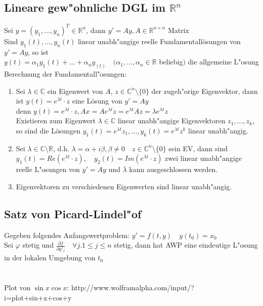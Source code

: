\documentclass[10pt,a4paper^, twocolumn]{article}
\newcommand{\menge}{\mathbb} %
\renewcommand{\phi}{\varphi} %
\begin{document}
\subsection{Lineare gew"ohnliche DGL im $\menge{R}^n$}
	Sei $y = (y_1,\dots,y_n)^T \in \menge{R}^n$, dann $y' = Ay, A \in \menge{R}^{n\times n}$ Matrix \\
	Sind $y_1(t),\dots,y_n(t)$ linear unabh"angige reelle Fundamentallösungen von $y' = Ay$,
	so ist \\
	$y(t) = \alpha_1 y_1(t)+\dots+\alpha_ny_(t) \quad (\alpha_1,\dots,\alpha_n \in \menge{R}$ beliebig$)$ die allgemeine L"osung\\
	Berechnung der Fundamentall"osungen:
	\begin{enumerate}
	\item{} Sei $\lambda \in \menge{C}$ ein Eigenwert von $A$, $z \in \menge{C}^n \setminus \{0\}$ der zugeh"orige Eigenvektor,
		dann ist $y(t) = e^{\lambda t} \cdot z$ eine Lösung von $y' = Ay$  \\
		denn $y(t) = e^{\lambda t} \cdot z, Ax = Ae^{\lambda t}z = e^{\lambda t}Az = \lambda e^{\lambda t}z$ \\
		Existieren zum Eigenwert $\lambda \in \menge{C}$ linear unabh"angige Eigenvektoren $z_1,\dots,z_k$, so sind die Lösungen
		$y_1(t) = e^{\lambda t}z_1, \dots, y_k(t) = e^{\lambda t}z^k$ linear unabh"angig.
	\item{} Sei $\lambda \in \menge{C} \setminus \menge{R}$, d.h. $\lambda = \alpha + i\beta, \beta \neq 0 \quad z \in \menge{C}^n \setminus \{0\}$ sein EV,
		dann sind $y_1(t) = Re(e^{\lambda t} \cdot z), \quad y_2(t) = Im(e^{\lambda t} \cdot z)$ zwei linear unabh"angige reelle L"osungen von $y' = Ay$ 
		und $\overline\lambda$ kann ausgeschlossen werden.
	\item{} Eigenvektoren zu verschiedenen Eigenwerten sind linear unabh"angig.
	\end{enumerate}

\subsection{Satz von Picard-Lindel"of}
	Gegeben folgendes Anfangswertproblem: $y' = f(t,y) \quad y(t_0) = x_0$ \\
	Sei $\phi$ stetig und $\frac{\partial f}{\partial y'_j} \quad \forall j.1 \leq j \leq n$ stetig,
	dann hat AWP eine eindeutige L"osung in der lokalen Umgebung von $t_0$
\\\\\\
Plot von $\sin x \cos x$: http://www.wolframalpha.com/input/?i=plot+sin+x+cos+y
\end{document}
